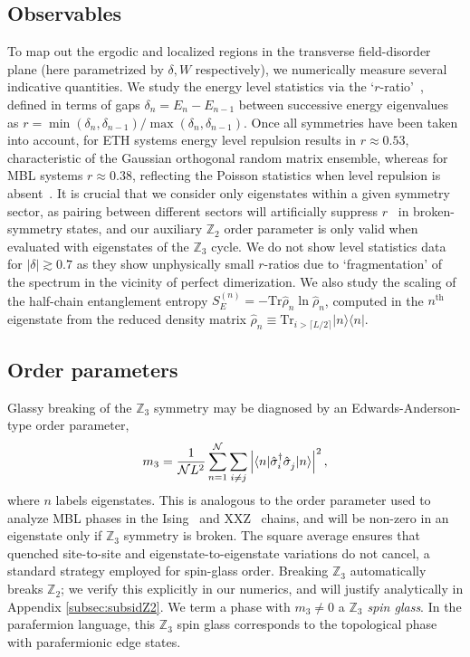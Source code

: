 \documentclass[prb,aps, twocolumn, superscriptaddress]{revtex4-1}
\newcommand{\be}{\begin{eqnarray}}
\newcommand{\ee}{\end{eqnarray}}
\def\ket#1{{|#1\rangle}}
\def\bra#1{{\langle #1 |}}
\begin{document}
\subsection{Observables}
To map out the ergodic and localized regions in the transverse field-disorder plane (here parametrized by $\delta, W$ respectively), we numerically measure several indicative quantities.  We study the energy level statistics via the {`$r$-ratio'~\cite{PalHuse}}, defined in terms of gaps $\delta_n = E_n -E_{n-1}$ between successive energy eigenvalues as $r = \min(\delta_n,\delta_{n-1})/\max(\delta_n,\delta_{n-1})$. Once all symmetries have been taken into account, for ETH systems energy level repulsion results in $r\approx 0.53$, characteristic of the Gaussian orthogonal random matrix ensemble, whereas for MBL systems $r \approx 0.38$, reflecting the Poisson statistics when level repulsion is absent~\cite{PhysRevB.75.155111, PalHuse}. 
It is crucial that we consider only eigenstates within a given symmetry sector, as pairing between different sectors will artificially suppress $r$~\cite{HuseMBLQuantumOrder, XXZPaper} in broken-symmetry states, and our auxiliary $\mathbb{Z}_2$ order parameter is only valid when evaluated with eigenstates of the $\mathbb{Z}_3$ cycle. We do not show level statistics data for $|\delta|\gtrsim 0.7$ as they show unphysically small $r$-ratios due to  `fragmentation' of the spectrum in the vicinity of perfect dimerization. We also study the scaling of the half-chain entanglement entropy $S_E^{(n)} =-\text{Tr} {\hat{\rho}_n}\ln {\hat{\rho}_n}$, computed in the $n^{\text{th}}$ eigenstate from the reduced density matrix ${\hat{\rho}_n} \equiv \text{Tr}_{i> \lceil L/2\rceil } \ket{n}\bra{n}$.

\subsection{Order parameters}
Glassy breaking of the ${\mathbb{Z}_3}$ symmetry may be diagnosed by an Edwards-Anderson-type order parameter, 
\be\label{eq:s3op}
m_3 = \frac{1}{\mathcal{N}L^2} \sum_{n=1}^{\mathcal{N}}\sum_{i\neq j} \left|\bra{n}{\hat{\sigma}}^{\dagger}_i {\hat{\sigma}}^{\vphantom{\dagger}}_j \ket{n}\right|^2,
\ee
where $n$ labels eigenstates. This is analogous to the order parameter used to analyze MBL phases in the Ising~\cite{KjallIsing} and XXZ~\cite{XXZPaper} chains, and will be non-zero in an eigenstate only if ${\mathbb{Z}_3}$ symmetry is broken. The square average ensures that quenched site-to-site and eigenstate-to-eigenstate variations do not cancel, a standard strategy employed for spin-glass order. Breaking ${\mathbb{Z}_3}$ automatically breaks ${\mathbb{Z}_2}$; we verify this explicitly in our numerics, and will justify analytically in Appendix \ref{subsec:subsidZ2}. We term a phase with ${m_{3}\neq 0}$ a {\it ${\mathbb{Z}_3}$ spin glass}. {In the parafermion language, this $\mathbb{Z}_3$ spin glass corresponds to the topological phase with parafermionic edge states.}
\end{document}
